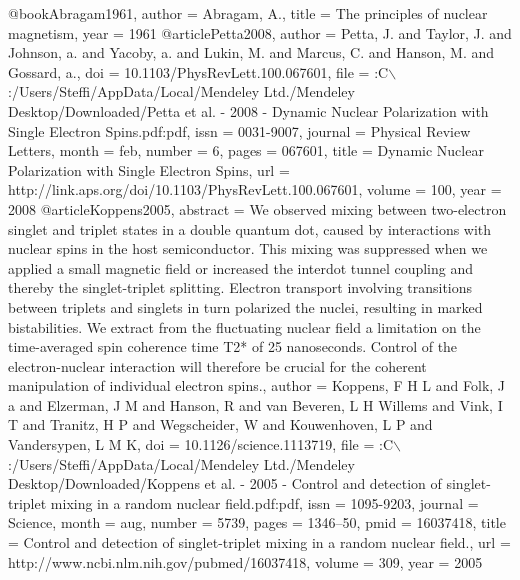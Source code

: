 @book{Abragam1961,
author = {Abragam, A.},
title = {{The principles of nuclear magnetism}},
year = {1961}
}
@article{Petta2008,
author = {Petta, J. and Taylor, J. and Johnson, a. and Yacoby, a. and Lukin, M. and Marcus, C. and Hanson, M. and Gossard, a.},
doi = {10.1103/PhysRevLett.100.067601},
file = {:C$\backslash$:/Users/Steffi/AppData/Local/Mendeley Ltd./Mendeley Desktop/Downloaded/Petta et al. - 2008 - Dynamic Nuclear Polarization with Single Electron Spins.pdf:pdf},
issn = {0031-9007},
journal = {Physical Review Letters},
month = {feb},
number = {6},
pages = {067601},
title = {{Dynamic Nuclear Polarization with Single Electron Spins}},
url = {http://link.aps.org/doi/10.1103/PhysRevLett.100.067601},
volume = {100},
year = {2008}
}
@article{Koppens2005,
abstract = {We observed mixing between two-electron singlet and triplet states in a double quantum dot, caused by interactions with nuclear spins in the host semiconductor. This mixing was suppressed when we applied a small magnetic field or increased the interdot tunnel coupling and thereby the singlet-triplet splitting. Electron transport involving transitions between triplets and singlets in turn polarized the nuclei, resulting in marked bistabilities. We extract from the fluctuating nuclear field a limitation on the time-averaged spin coherence time T2* of 25 nanoseconds. Control of the electron-nuclear interaction will therefore be crucial for the coherent manipulation of individual electron spins.},
author = {Koppens, F H L and Folk, J a and Elzerman, J M and Hanson, R and van Beveren, L H Willems and Vink, I T and Tranitz, H P and Wegscheider, W and Kouwenhoven, L P and Vandersypen, L M K},
doi = {10.1126/science.1113719},
file = {:C$\backslash$:/Users/Steffi/AppData/Local/Mendeley Ltd./Mendeley Desktop/Downloaded/Koppens et al. - 2005 - Control and detection of singlet-triplet mixing in a random nuclear field.pdf:pdf},
issn = {1095-9203},
journal = {Science},
month = {aug},
number = {5739},
pages = {1346--50},
pmid = {16037418},
title = {{Control and detection of singlet-triplet mixing in a random nuclear field.}},
url = {http://www.ncbi.nlm.nih.gov/pubmed/16037418},
volume = {309},
year = {2005}
}
